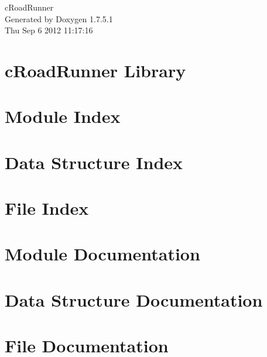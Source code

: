 \documentclass[a4paper]{book}
\begin{document}
\hypersetup{pageanchor=false,citecolor=blue}
\begin{titlepage}
\vspace*{7cm}
\begin{center}
{\Large c\-Road\-Runner }\\
\vspace*{1cm}
{\large \-Generated by Doxygen 1.7.5.1}\\
\vspace*{0.5cm}
{\small Thu Sep 6 2012 11:17:16}\\
\end{center}
\end{titlepage}
\clearemptydoublepage
{}
\tableofcontents
\clearemptydoublepage
{}
\hypersetup{pageanchor=true,citecolor=blue}
\chapter{c\-Road\-Runner \-Library}
\label{index}\hypertarget{index}{}
\chapter{\-Module \-Index}

\chapter{\-Data \-Structure \-Index}

\chapter{\-File \-Index}

\chapter{\-Module \-Documentation}















\chapter{\-Data \-Structure \-Documentation}










\chapter{\-File \-Documentation}



\printindex
\end{document}
